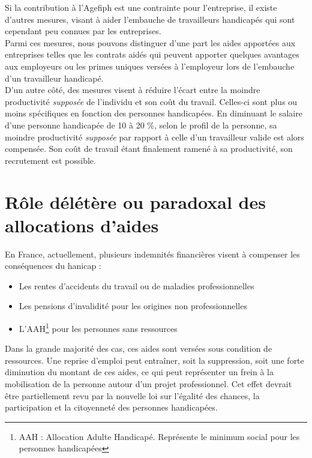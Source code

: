 Si la contribution à l'Agefiph est une contrainte pour l'entreprise, il existe d'autres mesures, visant à aider l'embauche de travailleurs handicapés qui sont cependant peu connues par les entreprises.\\

Parmi ces mesures, nous pouvons distinguer d'une part les aides apportées aux entreprises telles que les contrats aidés qui peuvent apporter quelques avantages aux employeurs ou les primes uniques versées à l'employeur lors de l'embauche d'un travailleur handicapé.\\

D'un autre c\^oté, des mesures visent à réduire l'écart entre la moindre productivité \textit{supposée} de l'individu et son co\^ut du travail. Celles-ci sont plus ou moins spécifiques en fonction des personnes handicapées. En diminuant le salaire d'une personne handicapée de 10 à 20 \%, selon le profil de la personne, sa moindre productivité \textit{supposée} par rapport à celle d'un travailleur valide est alors compensée. Son co\^ut de travail étant finalement ramené à sa productivité, son recrutement est possible.

\section{R\^ole délétère ou paradoxal des allocations d'aides}
\label{allocationsAide}

En France, actuellement, plusieurs indemnités financières visent à compenser les conséquences du hanicap :
\begin{itemize}
\item Les rentes d'accidents du travail ou de maladies professionnelles
\item Les pensions d'invalidité pour les origines non professionnelles
\item L'AAH\footnote{AAH : Allocation Adulte Handicapé. Représente le minimum social pour les personnes handicapées} pour les personnes sans ressources\\
\end{itemize}

Dans la grande majorité des cas, ces aides sont versées sous condition de ressources. 
Une reprise d'emploi peut entraîner, soit la suppression, soit une forte diminution du montant de ces aides, ce qui peut représenter un frein à la mobilisation de la personne autour d'un projet professionnel. Cet effet devrait être partiellement revu par la nouvelle loi sur l'égalité des chances, la participation et la citoyenneté des personnes handicapées.

